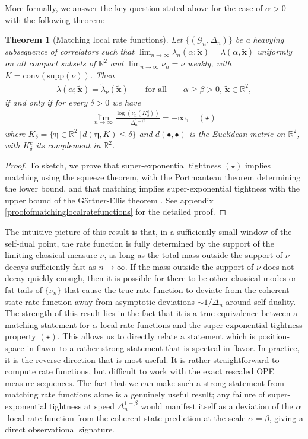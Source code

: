 \documentclass[a4paper,11pt]{article}
\theoremstyle{plain}
\newtheorem{thm}{Theorem}[section]
\theoremstyle{definition}
\theoremstyle{remark}
\newcommand{\bs}[1]{\boldsymbol{#1}}
\newcommand{\ba}{\begin{equation} \begin{aligned}}
\newcommand{\ea}{\end{aligned} \end{equation}}
\newcommand{\De}{\Delta}
\begin{document}
More formally, we answer the key question stated above for the case of $\alpha>0$ with the following theorem:
\begin{thm}[Matching local rate functions]
\label{matchinglocalratefunctions}
Let $\{(\mathcal{G}_n,\De_n)\}$ be a heavying subsequence of correlators such that $\lim_{n\to\infty}\lambda_n(\alpha;\tilde{\bs{x}}) = \lambda(\alpha,\tilde{\bs{x}})$ uniformly on all compact subsets of $\mathbb{R}^2$ and $\lim_{n\to\infty} \nu_n = \nu$ weakly, with $K = \mathrm{conv}(\mathrm{supp}(\nu))$. Then 
\ba
\lambda(\alpha;\tilde{\bs{x}}) =\tilde{\lambda}_{\nu}(\tilde{\bs{x}}) \qquad\text{for all}\qquad \alpha \geq \beta > 0,\, \tilde{\bs{x}} \in \mathbb{R}^2,
\ea
if and only if for every $\delta > 0$ we have
\ba
\lim_{n\to\infty} \frac{\log(\nu_n(K_\delta^c))}{\De_n^{1-\beta}} = -\infty,\quad (\star)
\ea
where $K_\delta = \{ \bs{\eta}\in \mathbb{R}^2\,|\, d(\bs{\eta},K)\leq \delta\}$ and $d(\bullet,\bullet)$ is the Euclidean metric on $\mathbb{R}^2$, with $K_\delta^c$ its complement in $\mathbb{R}^2$.
\end{thm}

\begin{proof}
To sketch, we prove that super-exponential tightness $(\star)$ implies matching using the squeeze theorem, with the Portmanteau theorem determining the lower bound, and that matching implies super-exponential tightness with the upper bound of the G\"artner-Ellis theorem \cite{DemboZeitouni1998}. See appendix \ref{proofofmatchinglocalratefunctions} for the detailed proof.
\end{proof}

The intuitive picture of this result is that, in a sufficiently small window of the self-dual point, the rate function is fully determined by the support of the limiting classical measure $\nu$, as long as the total mass outside the support of $\nu$ decays sufficiently fast as $n \to\infty$. If the mass outside the support of $\nu$ does not decay quickly enough, then it is possible for there to be other classical modes or fat tails of $\{\nu_n\}$ that cause the true rate function to deviate from the coherent state rate function away from asymptotic deviations $\sim 1/\De_n$ around self-duality. The strength of this result lies in the fact that it is a true equivalence between a matching statement for $\alpha$-local rate functions and the super-exponential tightness property $(\star)$. This allows us to directly relate a statement which is position-space in flavor to a rather strong statement that is spectral in flavor. In practice, it is the reverse direction that is most useful. It is rather straightforward to compute rate functions, but difficult to work with the exact rescaled OPE measure sequences. The fact that we can make such a strong statement from matching rate functions alone is a genuinely useful result; any failure of super-exponential tightness at speed $\De_n^{1-\beta}$ would manifest itself as a deviation of the $\alpha$-local rate function from the coherent state prediction at the scale $\alpha = \beta$, giving a direct observational signature.
\end{document}
